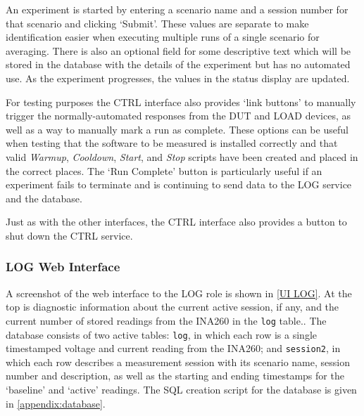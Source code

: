 An experiment is started by entering a scenario name and a session number for that scenario and clicking `Submit'. These values are separate to make identification easier when executing multiple runs of a single scenario for averaging. There is also an optional field for some descriptive text which will be stored in the database with the details of the experiment but has no automated use. As the experiment progresses, the values in the status display are updated.

For testing purposes the CTRL interface also provides `link buttons' to manually trigger the normally-automated responses from the DUT and LOAD devices, as well as a way to manually mark a run as complete. These options can be useful when testing that the software to be measured is installed correctly and that valid \emph{Warmup}, \emph{Cooldown}, \emph{Start}, and \emph{Stop} scripts have been created and placed in the correct places. The `Run Complete' button is particularly useful if an experiment fails to terminate and is continuing to send data to the LOG service and the database.

Just as with the other interfaces, the CTRL interface also provides a button to shut down the CTRL service.

\subsubsection{LOG Web Interface}
\label{Web UI LOG}

A screenshot of the web interface to the LOG role is shown in \autoref{UI LOG}. At the top is diagnostic information about the current active session, if any, and the current number of stored readings from the INA260 in the \verb!log! table.. The database consists of two active tables: \verb!log!, in which each row is a single timestamped voltage and current reading from the INA260; and \verb!session2!, in which each row describes a measurement session with its scenario name, session number and description, as well as the starting and ending timestamps for the `baseline' and `active' readings. The SQL creation script for the database is given in \autoref{appendix:database}.

